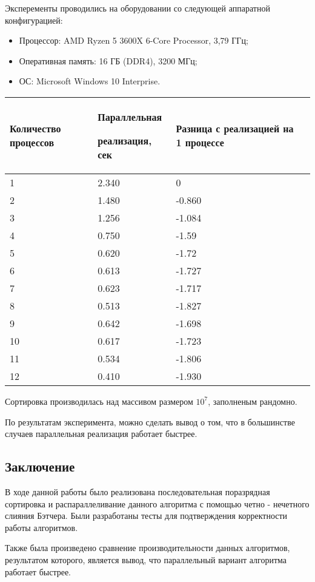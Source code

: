 \documentclass{report}
\begin{document}
Эксперементы проводились на оборудовании со следующей аппаратной конфигурацией:
\begin{itemize}
\item Процессор: AMD Ryzen 5 3600X 6-Core Processor, 3,79 ГГц;
\item Оперативная память: 16 ГБ (DDR4), 3200 МГц;
\item ОС: Microsoft Windows 10 Interprise.
\end{itemize}
\begin{table}[h]
    \begin{tabular}{ | p{4cm} | p{4cm} | p{4cm} | p{4cm} | }
    \hline
    Количество процессов & Параллельная \par реализация, сек & Разница с реализацией на 1 процессе\\ \hline
    1    & 2.340  &0 \\ \hline
    2    & 1.480  &-0.860 \\ \hline
    3    & 1.256  &-1.084 \\ \hline
    4    & 0.750  &-1.59 \\ \hline
    5    & 0.620  &-1.72 \\ \hline 
    6    & 0.613  &-1.727 \\ \hline
    7    & 0.623  &-1.717 \\ \hline
    8    & 0.513  &-1.827 \\ \hline
    9    & 0.642  &-1.698 \\ \hline
    10   & 0.617  &-1.723 \\ \hline
    11   & 0.534  &-1.806 \\ \hline
    12   & 0.410  &-1.930 \\ \hline
    \end{tabular}
\end{table}
\par Сортировка производилась над массивом размером $10^7$, заполненым рандомно.
\par По результатам эксперимента, можно сделать вывод о том, что в большинстве случаев параллельная реализация работает быстрее.

\newpage
\begin{center}
\section*{Заключение}
\end{center}

В ходе данной работы было реализована последовательная поразрядная сортировка и распараллеливание данного алгоритма с помощью четно - нечетного слияния Бэтчера. Были разработаны тесты для подтверждения корректности работы алгоритмов.
\par Также была произведено сравнение производительности данных алгоритмов, результатом которого, является вывод, что параллельный вариант алгоритма работает быстрее.
\end{document}
